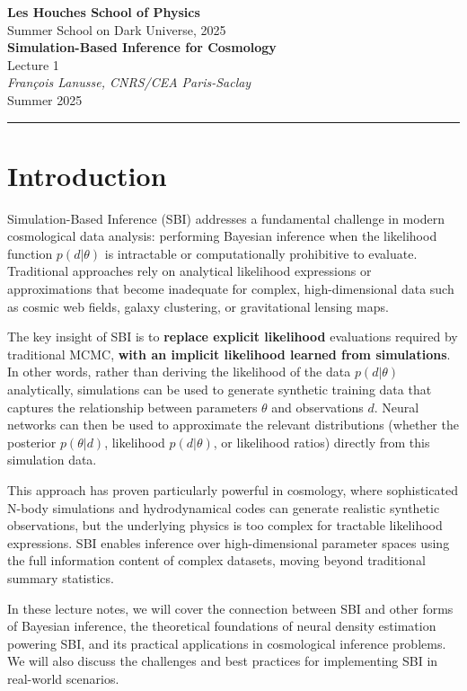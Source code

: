 \documentclass[11pt,a4paper]{article}
\makeatletter
\theoremstyle{definition}
\newcommand{\lecturetitle}[1]{\gdef\@lecturetitle{#1}}
\newcommand{\lecturer}[1]{\gdef\@lecturer{#1}}
\newcommand{\lecturedate}[1]{\gdef\@lecturedate{#1}}
\newcommand{\lecturenumber}[1]{\gdef\@lecturenumber{#1}\gdef\thelecturenumber{#1}}
\gdef\@lecturetitle{Lecture Title}
\gdef\@lecturer{Lecturer Name}
\gdef\@lecturedate{\today}
\gdef\@lecturenumber{1}
\renewcommand{\maketitle}{
    \begin{center}
        {\Large\textcolor{leshouches}{\textbf{Les Houches School of Physics}}}\\[0.5em]
        {\large Summer School on Dark Universe, 2025}\\[1.5em]
        {\huge\textbf{\@lecturetitle}}\\[0.5em]
        {\large Lecture \@lecturenumber}\\[1em]
        {\large\textit{\@lecturer}}\\[0.5em]
        {\@lecturedate}
    \end{center}
    \vspace{1em}
    \hrule
    \vspace{1.5em}
}
\makeatother
\begin{document}
\lecturetitle{Simulation-Based Inference for Cosmology}
\lecturer{François Lanusse, CNRS/CEA Paris-Saclay}
\lecturedate{Summer 2025}
\lecturenumber{1}

\maketitle

\section{Introduction}

Simulation-Based Inference (SBI) addresses a fundamental challenge in modern cosmological data analysis: performing Bayesian inference when the likelihood function $p(d|\theta)$ is intractable or computationally prohibitive to evaluate. Traditional approaches rely on analytical likelihood expressions or approximations that become inadequate for complex, high-dimensional data such as cosmic web fields, galaxy clustering, or gravitational lensing maps.

The key insight of SBI is to \textbf{replace explicit likelihood} evaluations required by traditional MCMC, \textbf{with an implicit likelihood learned from simulations}. In other words, rather than deriving the likelihood of the data $p(d|\theta)$ analytically, simulations can be used to generate synthetic training data that captures the relationship between parameters $\theta$ and observations $d$. Neural networks can then be used to approximate the relevant distributions (whether the posterior $p(\theta|d)$, likelihood $p(d|\theta)$, or likelihood ratios) directly from this simulation data.

This approach has proven particularly powerful in cosmology, where sophisticated N-body simulations and hydrodynamical codes can generate realistic synthetic observations, but the underlying physics is too complex for tractable likelihood expressions. SBI enables inference over high-dimensional parameter spaces using the full information content of complex datasets, moving beyond traditional summary statistics.

In these lecture notes, we will cover the connection between SBI and other forms of Bayesian inference, the theoretical foundations of neural density estimation powering SBI, and its practical applications in cosmological inference problems. We will also discuss the challenges and best practices for implementing SBI in real-world scenarios.
\end{document}
